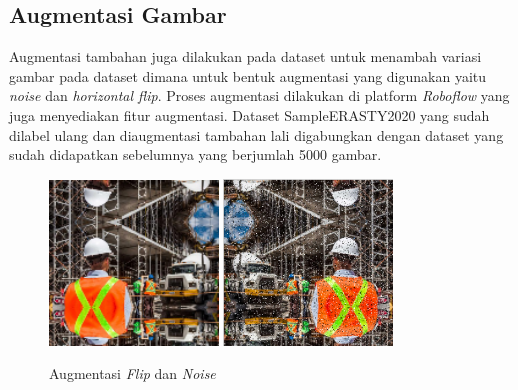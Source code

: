 \subsection{Augmentasi Gambar}
\par Augmentasi tambahan juga dilakukan pada dataset untuk menambah variasi gambar 
pada dataset dimana untuk bentuk augmentasi yang digunakan yaitu \emph{noise} 
dan \emph{horizontal flip}. Proses augmentasi dilakukan di platform \emph{Roboflow} 
yang juga menyediakan fitur augmentasi. Dataset SampleERASTY2020 yang sudah dilabel 
ulang dan diaugmentasi tambahan lali digabungkan dengan dataset yang sudah 
didapatkan sebelumnya yang berjumlah 5000 gambar. 

\begin{figure}[ht]
  \centering
  \includegraphics[width=0.4\textwidth]{gambar/aug_flip.png}
  \includegraphics[width=0.4\textwidth]{gambar/aug_noise.png}
  \caption{Augmentasi \emph{Flip} dan \emph{Noise}}
  \label{fig:prepro_augmentasi}  
\end{figure}


